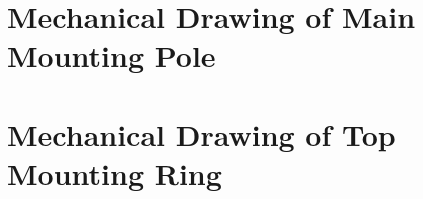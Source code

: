 \section{Mechanical Drawing of Main Mounting Pole} \label{appendix_mechanical_drawing_main_mounting_pole}
\enlargethispage{2.5cm}
\begin{adjustwidth}{0.23cm}{0cm} \hfuzz=7.0pt \vfuzz=20.0pt
\end{adjustwidth}
\newpage

\section{Mechanical Drawing of Top Mounting Ring} \label{appendix_mechanical_drawing_top_mounting_ring}
\enlargethispage{2.5cm}
\begin{adjustwidth}{-0.23cm}{0cm} \hfuzz=7.0pt \vfuzz=20.0pt
\end{adjustwidth}
\newpage


